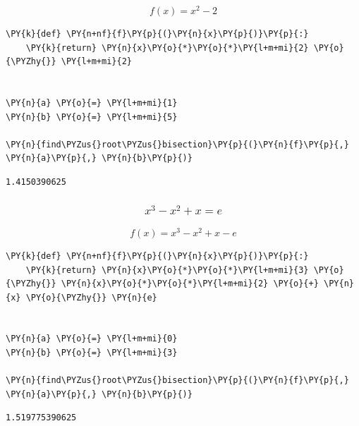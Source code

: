 \[f(x) = x^2 - 2\]

    \begin{tcolorbox}[breakable, size=fbox, boxrule=1pt, pad at break*=1mm,colback=cellbackground, colframe=cellborder]
\begin{Verbatim}[commandchars=\\\{\}]
\PY{k}{def} \PY{n+nf}{f}\PY{p}{(}\PY{n}{x}\PY{p}{)}\PY{p}{:}
    \PY{k}{return} \PY{n}{x}\PY{o}{*}\PY{o}{*}\PY{l+m+mi}{2} \PY{o}{\PYZhy{}} \PY{l+m+mi}{2}


\PY{n}{a} \PY{o}{=} \PY{l+m+mi}{1}
\PY{n}{b} \PY{o}{=} \PY{l+m+mi}{5}

\PY{n}{find\PYZus{}root\PYZus{}bisection}\PY{p}{(}\PY{n}{f}\PY{p}{,} \PY{n}{a}\PY{p}{,} \PY{n}{b}\PY{p}{)}
\end{Verbatim}
\end{tcolorbox}

            \begin{tcolorbox}[breakable, size=fbox, boxrule=.5pt, pad at break*=1mm, opacityfill=0]
\begin{Verbatim}[commandchars=\\\{\}]
1.4150390625
\end{Verbatim}
\end{tcolorbox}
        
    \hypertarget{x3---x2-x-e}{%
\subsubsection{\texorpdfstring{\[x^3 - x^2 + x = e\]}{x\^{}3 - x\^{}2 + x = e}}\label{x3---x2-x-e}}

\[f(x) = x^3 - x^2 + x - e\]

    \begin{tcolorbox}[breakable, size=fbox, boxrule=1pt, pad at break*=1mm,colback=cellbackground, colframe=cellborder]
\begin{Verbatim}[commandchars=\\\{\}]
\PY{k}{def} \PY{n+nf}{f}\PY{p}{(}\PY{n}{x}\PY{p}{)}\PY{p}{:}
    \PY{k}{return} \PY{n}{x}\PY{o}{*}\PY{o}{*}\PY{l+m+mi}{3} \PY{o}{\PYZhy{}} \PY{n}{x}\PY{o}{*}\PY{o}{*}\PY{l+m+mi}{2} \PY{o}{+} \PY{n}{x} \PY{o}{\PYZhy{}} \PY{n}{e}


\PY{n}{a} \PY{o}{=} \PY{l+m+mi}{0}
\PY{n}{b} \PY{o}{=} \PY{l+m+mi}{3}

\PY{n}{find\PYZus{}root\PYZus{}bisection}\PY{p}{(}\PY{n}{f}\PY{p}{,} \PY{n}{a}\PY{p}{,} \PY{n}{b}\PY{p}{)}
\end{Verbatim}
\end{tcolorbox}

            \begin{tcolorbox}[breakable, size=fbox, boxrule=.5pt, pad at break*=1mm, opacityfill=0]
\begin{Verbatim}[commandchars=\\\{\}]
1.519775390625
\end{Verbatim}
\end{tcolorbox}
        

    
    
    
